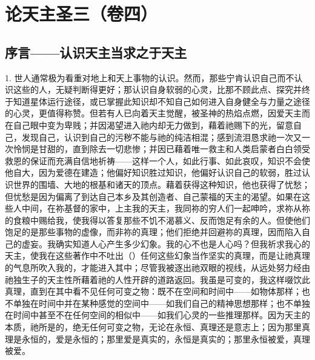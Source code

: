 

\section{论天主圣三（卷四）}

\par


\subsection{序言——认识天主当求之于天主}

1. 世人通常极为看重对地上和天上事物的认识。然而，那些宁肯认识自己而不认识这些的人，无疑判断得更好；那认识自身软弱的心灵，比那不顾此点、探究并终于知道星体运行途径，或已掌握此知识却不知自己如何进入自身健全与力量之途径的心灵，更值得称赞。但若有人已向着天主觉醒，被圣神的热焰点燃，因爱天主而在自己眼中变为卑贱；并因渴望进入祂内却无力做到，藉着祂赐下的光，留意自己，发现自己，认识到自己的污秽不能与祂的纯洁相混；感到流泪恳求祂一次又一次怜悯是甘甜的，直到除去一切悲惨；并因已藉着唯一救主和人类启蒙者白白领受救恩的保证而充满自信地祈祷——这样一个人，如此行事、如此哀叹，知识不会使他自大，因为爱德在建造；他偏好知识胜过知识，他偏好认识自己的软弱，胜过认识世界的围墙、大地的根基和诸天的顶点。藉着获得这种知识，他也获得了忧愁；但忧愁是因为偏离了到达自己本乡及其创造者、自己蒙福的天主的渴望。如果在这些人中间，在祢基督的家中，上主我的天主，我同祢的穷人们一起呻吟，求祢从祢的食粮中赐给我，使我得以答复那些不饥不渴慕义、反而饱足有余的人。但使他们饱足的是那些事物的虚像，而非祢的真理；他们拒绝并回避祢的真理，因而陷入自己的虚妄。我确实知道人心产生多少幻象。我的心不也是人心吗？但我祈求我心的天主，使我在这些著作中不吐出（）任何这些幻象当作坚实的真理，而是让祂真理的气息所吹入我的，才能进入其中；尽管我被逐出祂双眼的视线，从远处努力经由祂独生子的天主性所藉着祂的人性开辟的道路返回。我虽是可变的，我这样啜饮此真理，直到在其中看不见任何可变之物：既不在空间和时间中——如物体那样；也不单独在时间中并在某种感觉的空间中——如我们自己的精神思想那样；也不单独在时间中甚至不在任何空间的相似中——如我们心灵的一些推理那样。因为天主的本质，祂所是的，绝无任何可变之物，无论在永恒、真理还是意志上；因为那里真理是永恒的，爱是永恒的；那里爱是真实的，永恒是真实的；那里永恒被爱，真理被爱。\par

